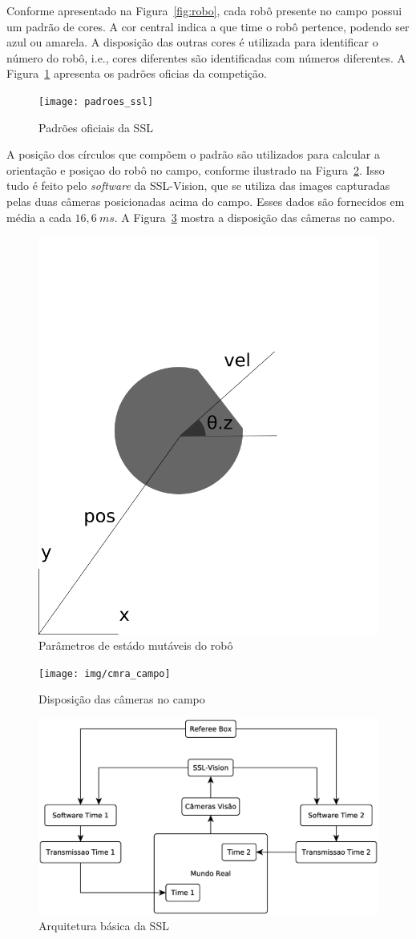 Conforme apresentado na Figura~\ref{fig:robo}, cada robô presente no campo possui
um padrão de cores. A cor central indica a que time o robô pertence, podendo ser
azul ou amarela. A disposição das outras cores é utilizada para identificar o número
do robô, i.e., cores diferentes são identificadas com números diferentes. A
Figura~\ref{fig:padroes_ssl} apresenta os padrões oficias da competição.

\begin{figure}[thpb]
  \centering
  \texttt{[image: padroes\_ssl]}
  \caption{Padrões oficiais da SSL~\cite{zickler-ssl}}\label{fig:padroes_ssl}
\end{figure}

A posição dos círculos que compõem o padrão são utilizados para calcular a orientação
e posiçao do robô no campo, conforme ilustrado na Figura~\ref{fig:rob_data}. Isso
tudo é feito pelo \textit{software} da SSL-Vision, que se utiliza das images capturadas
pelas duas câmeras posicionadas acima do campo. Esses dados são fornecidos em média a
cada $16,6{\ }ms$. A Figura~\ref{fig:cmra_campo} mostra a disposição das câmeras no
campo.

\begin{figure}[thpb]
  \centering
  \includegraphics[width=0.5\linewidth]{img/rob_data}
  \caption{Parâmetros de estádo mutáveis do robô}\label{fig:rob_data}
\end{figure}

\begin{figure}[thpb]
  \centering
  \texttt{[image: img/cmra\_campo]}
  \caption{Disposição das câmeras no campo}\label{fig:cmra_campo}
\end{figure}

\begin{figure}[thpb]
  \centering
  \includegraphics[width= 0.8\linewidth]{img/arq_ssl}
  \caption{Arquitetura básica da SSL}\label{fig:arquitetura_ssl}
\end{figure}

